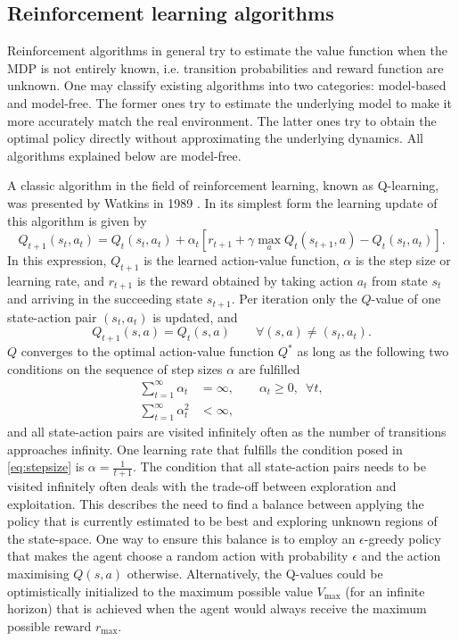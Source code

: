 \documentclass[../main.tex]{subfiles}
\begin{document}
\subsection{Reinforcement learning algorithms}
Reinforcement algorithms in general try to estimate the value function when the MDP is not entirely known, i.e. transition probabilities and reward function are unknown. One may classify existing algorithms into two categories: model-based and model-free. The former ones try to estimate the underlying model to make it more accurately match the real environment. The latter ones try to obtain the optimal policy directly without approximating the underlying dynamics. All algorithms explained below are model-free. \par
A classic algorithm in the field of reinforcement learning, known as Q-learning, was presented by Watkins in 1989 \cite{watkins1992q}. In its simplest form the learning update of this algorithm is given by
\begin{equation}
Q_{t+1}(s_t,a_t) = Q_{t}(s_t,a_t) + \alpha_t \left[ r_{t+1}+\gamma \max_a Q_{t}(s_{t+1},a) - Q_{t}(s_t,a_t)\right].
\end{equation}
In this expression, $Q_{t+1}$ is the learned action-value function, $\alpha$ is the step size or learning rate, and $r_{t+1}$ is the reward obtained by taking action $a_t$ from state $s_t$ and arriving in the succeeding state $s_{t+1}$.
Per iteration only the $Q$-value of one state-action pair $(s_t,a_t)$ is updated, and
\begin{equation}
    Q_{t+1}(s,a) = Q_{t}(s,a) \qquad \forall (s,a) \neq (s_t,a_t).
\end{equation}
$Q$ converges to the optimal action-value function $Q^*$ as long as the following two conditions on the sequence of step sizes $\alpha$ are fulfilled \cite{jaakkola1994convergence}
\begin{align}\label{eq:stepsize}
    \sum_{t=1}^\infty \alpha_t &= \infty, \qquad \alpha_t\geq 0, \enspace \forall t, \\
    \sum_{t=1}^\infty \alpha_t^2 &< \infty ,
\end{align}
and all state-action pairs are visited infinitely often as the number of transitions approaches infinity. One learning rate that fulfills the condition posed in \eqref{eq:stepsize} is $\alpha = \frac{1}{t+1}$. The condition that all state-action pairs needs to be visited infinitely often deals with the trade-off between exploration and exploitation. This describes the need to find a balance between applying the policy that is currently estimated to be best and exploring unknown regions of the state-space. One way to ensure this balance is to employ an $\epsilon$-greedy policy that makes the agent choose a random action with probability $\epsilon$ and the action maximising $Q(s,a)$ otherwise. Alternatively, the Q-values could be optimistically initialized to the maximum possible value $V_{\max}$ (for an infinite horizon) that is achieved when the agent would always receive the maximum possible reward $r_{\max}$. 
\end{document}
